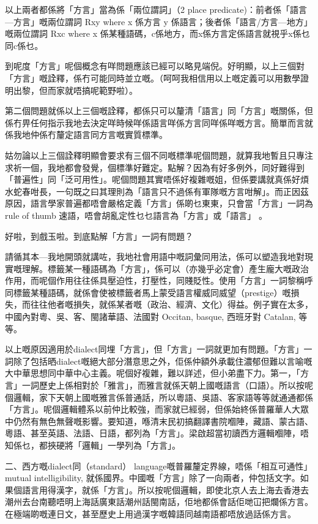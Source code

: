 以上兩者都係將「方言」當為係「兩位謂詞」（2 place predicate)：前者係「語言—方言」嘅兩位謂詞 Rxy where x 係方言 y 係語言；後者係「語言/方言—地方」嘅兩位謂詞 Rxc where x 係某種語碼，c係地方，而x係方言定係語言就視乎x係乜同c係乜。

到呢度「方言」呢個概念有咩問題應該已經可以略見端倪。好明顯，以上三個對「方言」嘅詮釋，係冇可能同時並立嘅。（呵呵我相信用以上嘅定義可以用數學證明出黎，但而家就唔搞呢範野啦）。

第二個問題就係以上三個嘅詮釋，都係只可以釐清「語言」同「方言」嘅關係，但係冇畀任何指示我地去決定咩時候咩係語言咩係方言同咩係咩嘅方言。簡單而言就係我地仲係冇釐定語言同方言嘅實質標準。

姑勿論以上三個詮釋明顯會要求有三個不同嘅標準呢個問題，就算我地暫且只專注求祈一個，我地都會發覺，個標準好難定。點解？因為有好多例外，同好難得到「普遍性」同「泛可用性」。呢個問題其實唔係好複雜嘅姐，但係要講就真係好煩水蛇春咁長，一句既之曰其理則為「語言只不過係有軍隊嘅方言咁解」。而正因茲原因，語言學家普遍都唔會嚴格定義「方言」係啲乜東東，只會當「方言」一詞為rule of thumb 速語，唔會胡亂定性乜乜語言為「方言」或「語言」 。

好啦，到戲玉啦。到底點解「方言」一詞有問題？

請循其本—我地開頭就講咗，我地社會用語中嘅詞彙同用法，係可以塑造我地對現實嘅理解。標籤某一種語碼為「方言」，係可以（亦幾乎必定會）產生龐大嘅政治作用，而呢個作用往往係具壓迫性，打壓性，同賤貶性。使用「方言」一詞黎稱呼同標籤某種語碼，就係會使被標籤者馬上蒙受語言權威同威望（prestige）嘅損失，而往往他者嘅損失，就係某者嘅（政治、經濟、文化）得益。例子實在太多，中國內對粵、吳、客、閩諸華語、法國對 Occitan, basque, 西班牙對 Catalan, 等等。

以上嘅原因適用於dialect同埋「方言」，但「方言」一詞就更加有問題。「方言」一詞除了包括晒dialect嘅絕大部分潛意思之外，佢係仲額外承載住濃郁但難以言喻嘅大中華思想同中華中心主義。呢個好複雜，難以詳述，但小弟盡下力。第一，「方言」一詞歷史上係相對於「雅言」，而雅言就係天朝上國嘅語言（口語）。所以按呢個邏輯，家下天朝上國嘅雅言係普通話，所以粵語、吳語、客家語等等就通通都係「方言」。呢個邏輯體系以前仲比較強，而家就已經弱，但係始終係普羅華人大眾中仍然有無色無聲嘅影響。要知道，喺清末民初搞翻譯書院嗰陣，藏語、蒙古語、粵語、甚至英語、法語、日語，都列為「方言」。梁啟超當初讀西方邏輯嗰陣，唔知係乜，都挾硬將「邏輯」一學列為「方言」。

二、西方嘅dialect同（standard） language嘅普羅釐定界線，唔係「相互可通性」mutual intelligibility, 就係國界。中國嘅「方言」除了一向兩者，仲包括文字。如果個語言用得漢字，就係「方言」。所以按呢個邏輯，即使北京人去上海去香港去潮州去台南聽唔明上海話廣東話潮州話閩南話，佢地都係會話佢哋冚把爛係方言。在極端啲嘅連日文，甚至歷史上用過漢字嘅韓語同越南語都唔放過話係方言。

